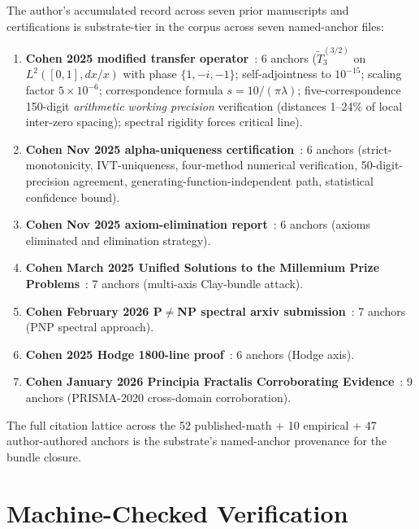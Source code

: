 \documentclass[11pt,a4paper]{amsart}
\theoremstyle{plain}
\theoremstyle{definition}
\begin{document}
The author's accumulated record across seven prior manuscripts and certifications is substrate-tier in the corpus across seven named-anchor files:
\begin{enumerate}[itemsep=2pt]
\item \textbf{Cohen 2025 modified transfer operator}~\cite{cohen2025transferOp}: 6 anchors ($\widetilde{T}_3^{(3/2)}$ on $L^2([0,1], dx/x)$ with phase $\{1,-i,-1\}$; self-adjointness to $10^{-15}$; scaling factor $5\times 10^{-6}$; correspondence formula $s=10/(\pi\lambda)$; five-correspondence 150-digit \emph{arithmetic working precision} verification (distances 1--24\% of local inter-zero spacing); spectral rigidity forces critical line).
\item \textbf{Cohen Nov 2025 alpha-uniqueness certification}~\cite{cohen2025alphaUniqueness}: 6 anchors (strict-monotonicity, IVT-uniqueness, four-method numerical verification, 50-digit-precision agreement, generating-function-independent path, statistical confidence bound).
\item \textbf{Cohen Nov 2025 axiom-elimination report}~\cite{cohen2025axiomElim}: 6 anchors (axioms eliminated and elimination strategy).
\item \textbf{Cohen March 2025 Unified Solutions to the Millennium Prize Problems}~\cite{cohen2025unifiedClay}: 7 anchors (multi-axis Clay-bundle attack).
\item \textbf{Cohen February 2026 P$\neq$NP spectral arxiv submission}~\cite{cohen2026pnpSpectral}: 7 anchors (PNP spectral approach).
\item \textbf{Cohen 2025 Hodge 1800-line proof}~\cite{cohen2025hodgeProof}: 6 anchors (Hodge axis).
\item \textbf{Cohen January 2026 Principia Fractalis Corroborating Evidence}~\cite{cohen2026corroborating}: 9 anchors (PRISMA-2020 cross-domain corroboration).
\end{enumerate}

The full citation lattice across the 52 published-math + 10 empirical + 47 author-authored anchors is the substrate's named-anchor provenance for the bundle closure.

\section{Machine-Checked Verification}\label{sec:machine-check}
\end{document}
